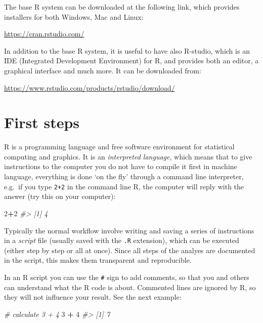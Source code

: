 \documentclass[
]{book}
\newenvironment{Shaded}{\begin{snugshade}}{\end{snugshade}}
\newcommand{\CommentTok}[1]{\textcolor[rgb]{0.56,0.35,0.01}{\textit{#1}}}
\newcommand{\DecValTok}[1]{\textcolor[rgb]{0.00,0.00,0.81}{#1}}
\newcommand{\SpecialCharTok}[1]{\textcolor[rgb]{0.81,0.36,0.00}{\textbf{#1}}}
\begin{document}
The base R system can be downloaded at the following link, which provides installers for both Windows, Mac and Linux:

\url{https://cran.rstudio.com/}

In addition to the base R system, it is useful to have also R-studio, which is an IDE (Integrated Development Environment) for R, and provides both an editor, a graphical interface and much more. It can be downloaded from:

\url{https://www.rstudio.com/products/rstudio/download/}

\section{First steps}\label{first-steps}

R is a programming language and free software environment for statistical computing and graphics. It is an \emph{interpreted language}, which means that to give instructions to the computer you do not have to compile it first in machine language, everything is done `on the fly' through a command line interpreter, e.g.~if you type \texttt{2+2} in the command line R, the computer will reply with the answer (try this on your computer):

\begin{Shaded}
\begin{Highlighting}[]
\DecValTok{2}\SpecialCharTok{+}\DecValTok{2}
\CommentTok{\#\textgreater{} [1] 4}
\end{Highlighting}
\end{Shaded}

Typically the normal workflow involve writing and saving a series of instructions in a \emph{script} file (usually saved with the \texttt{.R} extension), which can be executed (either step by step or all at once). Since all steps of the analyes are documented in the script, this makes them transparent and reproducible.

In an R script you can use the \texttt{\#} sign to add comments, so that you and others can understand what the R code is about. Commented lines are ignored by R, so they will not influence your result. See the next example:

\begin{Shaded}
\begin{Highlighting}[]
\CommentTok{\# calculate 3 + 4}
\DecValTok{3} \SpecialCharTok{+} \DecValTok{4}
\CommentTok{\#\textgreater{} [1] 7}
\end{Highlighting}
\end{Shaded}
\end{document}
